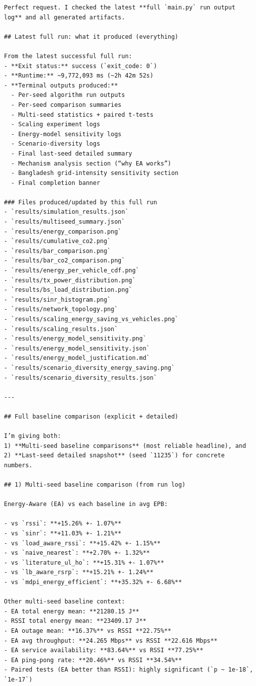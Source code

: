 \documentclass[11pt,a4paper]{article}
\newenvironment{assistantbox}
  {\begin{tcolorbox}[
    breakable,
    colback=AsstBG,
    colframe=AsstBorder,
    title=Project Overview Extract,
    fonttitle=\bfseries\small\color{white},
    coltitle=white,
    colbacktitle=AsstBorder,
    boxrule=0.5pt,
    arc=1.2mm,
    left=1.4mm,right=1.4mm,top=0.8mm,bottom=0.8mm,
    boxsep=0.6mm,
    before skip=0pt,
    after skip=0pt
  ]}
  {\end{tcolorbox}}
\begin{document}
\begin{assistantbox}
\begin{Verbatim}[breaklines=true,breakanywhere=true]
Perfect request. I checked the latest **full `main.py` run output log** and all generated artifacts.

## Latest full run: what it produced (everything)

From the latest successful full run:
- **Exit status:** success (`exit_code: 0`)
- **Runtime:** ~9,772,093 ms (~2h 42m 52s)
- **Terminal outputs produced:**
  - Per-seed algorithm run outputs
  - Per-seed comparison summaries
  - Multi-seed statistics + paired t-tests
  - Scaling experiment logs
  - Energy-model sensitivity logs
  - Scenario-diversity logs
  - Final last-seed detailed summary
  - Mechanism analysis section (“why EA works”)
  - Bangladesh grid-intensity sensitivity section
  - Final completion banner

### Files produced/updated by this full run
- `results/simulation_results.json`
- `results/multiseed_summary.json`
- `results/energy_comparison.png`
- `results/cumulative_co2.png`
- `results/bar_comparison.png`
- `results/bar_co2_comparison.png`
- `results/energy_per_vehicle_cdf.png`
- `results/tx_power_distribution.png`
- `results/bs_load_distribution.png`
- `results/sinr_histogram.png`
- `results/network_topology.png`
- `results/scaling_energy_saving_vs_vehicles.png`
- `results/scaling_results.json`
- `results/energy_model_sensitivity.png`
- `results/energy_model_sensitivity.json`
- `results/energy_model_justification.md`
- `results/scenario_diversity_energy_saving.png`
- `results/scenario_diversity_results.json`

---

## Full baseline comparison (explicit + detailed)

I’m giving both:
1) **Multi-seed baseline comparisons** (most reliable headline), and  
2) **Last-seed detailed snapshot** (seed `11235`) for concrete numbers.

## 1) Multi-seed baseline comparison (from run log)

Energy-Aware (EA) vs each baseline in avg EPB:

- vs `rssi`: **+15.26% +- 1.07%**
- vs `sinr`: **+11.03% +- 1.21%**
- vs `load_aware_rssi`: **+15.42% +- 1.15%**
- vs `naive_nearest`: **+2.70% +- 1.32%**
- vs `literature_ul_ho`: **+15.31% +- 1.07%**
- vs `lb_aware_rsrp`: **+15.21% +- 1.24%**
- vs `mdpi_energy_efficient`: **+35.32% +- 6.68%**

Other multi-seed baseline context:
- EA total energy mean: **21280.15 J**
- RSSI total energy mean: **23409.17 J**
- EA outage mean: **16.37%** vs RSSI **22.75%**
- EA avg throughput: **24.265 Mbps** vs RSSI **22.616 Mbps**
- EA service availability: **83.64%** vs RSSI **77.25%**
- EA ping-pong rate: **20.46%** vs RSSI **34.54%**
- Paired tests (EA better than RSSI): highly significant (`p ~ 1e-18`, `1e-17`)


\end{Verbatim}
\end{assistantbox}
\end{document}
